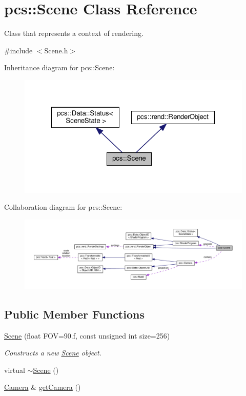 \hypertarget{classpcs_1_1Scene}{}\section{pcs\+:\+:Scene Class Reference}
\label{classpcs_1_1Scene}


Class that represents a context of rendering.  




{\ttfamily \#include $<$Scene.\+h$>$}



Inheritance diagram for pcs\+:\+:Scene\+:\nopagebreak
\begin{figure}[H]
\begin{center}
\leavevmode
\includegraphics[width=322pt]{classpcs_1_1Scene__inherit__graph}
\end{center}
\end{figure}


Collaboration diagram for pcs\+:\+:Scene\+:
\nopagebreak
\begin{figure}[H]
\begin{center}
\leavevmode
\includegraphics[width=350pt]{classpcs_1_1Scene__coll__graph}
\end{center}
\end{figure}
\subsection*{Public Member Functions}
\begin{DoxyCompactItemize}
\item 
\hyperlink{classpcs_1_1Scene_afb195a01eafa527bdc7fc8239bebd7a6}{Scene} (float F\+OV=90.f, const unsigned int size=256)
\begin{DoxyCompactList}\small\item\em Constructs a new \hyperlink{classpcs_1_1Scene}{Scene} object. \end{DoxyCompactList}\item 
virtual \hyperlink{classpcs_1_1Scene_a106aca266becd518d47821e08a87cf6f}{$\sim$\+Scene} ()
\item 
\hyperlink{classpcs_1_1Camera}{Camera} \& \hyperlink{classpcs_1_1Scene_a94be9eaa37239c5c0a854af148cf0225}{get\+Camera} ()
\end{DoxyCompactItemize}
